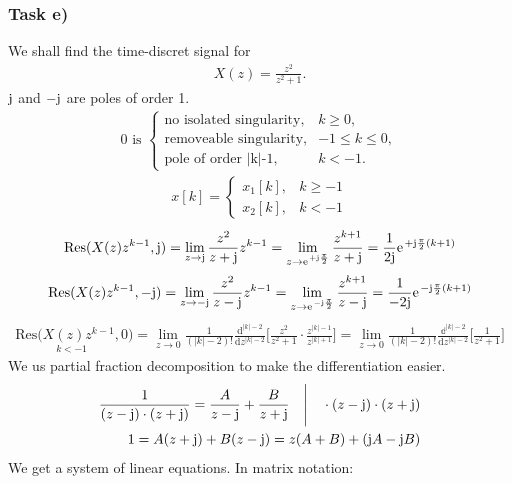 \subsubsection{Task e)}
We shall find the time-discret signal for 
\begin{align}
	X(z)=\frac{z^2}{z^2+1}.
\end{align}
$\im$ and $-\im$ are poles of order 1.
\begin{align}
	0 \text{ is }\begin{cases}
		\text{no isolated singularity}, &k\geq 0,\\
		\text{removeable singularity}, &-1\leq k \leq 0,\\
		\text{pole of order |k|-1}, &k<-1.
	\end{cases}
\end{align}
\begin{align}
	x[k]=\begin{cases}
		x_1[k], &k\geq -1 \\
		x_2[k], &k< -1
	\end{cases}
\end{align}
\begin{align}
	\mathrm{Res}(X(z)z^{k-1},\im)=\lim\limits_{z\rightarrow\im}\frac{z^2}{z+\im}z^{k-1}=\lim\limits_{z\rightarrow\e^{+\im\frac{\pi}{2}}}\frac{z^{k+1}}{z+\im}=\frac{1}{2\im}\e^{+\im\frac{\pi}{2}(k+1)}
\end{align}
\begin{align}
	\mathrm{Res}(X(z)z^{k-1},-\im)=\lim\limits_{z\rightarrow-\im}\frac{z^2}{z-\im}z^{k-1}=\lim\limits_{z\rightarrow\e^{-\im\frac{\pi}{2}}}\frac{z^{k+1}}{z-\im}=\frac{1}{-2\im}\e^{-\im\frac{\pi}{2}(k+1)}
\end{align}
\begin{align}
	\underset{k<-1}{\mathrm{Res}(X(z)z^{k-1},0})=\lim\limits_{z\rightarrow0}\frac{1}{(|k|-2)!}\frac{\mathrm{d}^{|k|-2}}{\mathrm{d}z^{|k|-2}}\Bigg [\frac{z^2}{z^2+1} \cdot\frac{z^{|k|-1}}{z^{|k|+1}}\Bigg]=\lim\limits_{z\rightarrow0}\frac{1}{(|k|-2)!}\frac{\mathbb{d}^{|k|-2}}{\mathrm{d}z^{|k|-2}}\Bigg [\frac{1}{z^2+1}\Bigg]
\end{align}
We us partial fraction decomposition to make the differentiation easier.
\begin{align}
	\frac{1}{(z-\im)\cdot(z+\im)}=\frac{A}{z-\im}+\frac{B}{z+\im}\quad\Bigg | \quad \cdot(z-\im)\cdot(z+\im) \nonumber \\
	1=A(z+\im)+B(z-\im)=z(A+B)+(\im A -\im B)
\end{align}
We get a system of linear equations. In matrix notation:
